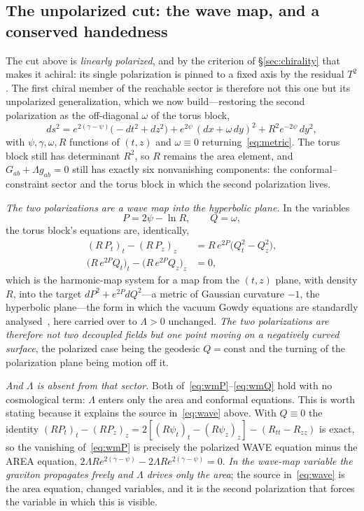 \documentclass[11pt,a4paper]{article}
\theoremstyle{plain}
\theoremstyle{definition}
\theoremstyle{remark}
\begin{document}
\subsection{The unpolarized cut: the wave map, and a conserved handedness}\label{sec:unpolarized}
The cut above is \emph{linearly polarized}, and by the criterion of \S\ref{sec:chirality} that makes it achiral: its single polarization is pinned to a fixed axis by the residual $T^2$. The first chiral member of the reachable sector is therefore not this one but its unpolarized generalization, which we now build---restoring the second polarization as the off-diagonal $\omega$ of the torus block,
\begin{equation}\label{eq:unpolarized}
ds^2 = e^{2(\gamma-\psi)}\bigl(-dt^2+dz^2\bigr) + e^{2\psi}\,(dx+\omega\,dy)^2 + R^2 e^{-2\psi}\,dy^2,
\end{equation}
with $\psi,\gamma,\omega,R$ functions of $(t,z)$ and $\omega\equiv0$ returning~\eqref{eq:metric}. The torus block still has determinant $R^2$, so $R$ remains the area element, and $G_{ab}+\Lambda g_{ab}=0$ still has exactly six nonvanishing components: the conformal--constraint sector and the torus block in which the second polarization lives.

\emph{The two polarizations are a wave map into the hyperbolic plane.} In the variables
\begin{equation}\label{eq:wavemapvars}
P = 2\psi-\ln R,\qquad Q=\omega,
\end{equation}
the torus block's equations are, identically,
\begin{align}
(R\,P_t)_t-(R\,P_z)_z &= R\,e^{2P}\bigl(Q_t^2-Q_z^2\bigr), \label{eq:wmP}\\
\bigl(R\,e^{2P}Q_t\bigr)_t-\bigl(R\,e^{2P}Q_z\bigr)_z &= 0, \label{eq:wmQ}
\end{align}
which is the harmonic-map system for a map from the $(t,z)$ plane, with density $R$, into the target $dP^2+e^{2P}dQ^2$---a metric of Gaussian curvature $-1$, the hyperbolic plane---the form in which the vacuum Gowdy equations are standardly analysed~\cite{Ringstrom2009}, here carried over to $\Lambda>0$ unchanged. \emph{The two polarizations are therefore not two decoupled fields but one point moving on a negatively curved surface}, the polarized case being the geodesic $Q=\mathrm{const}$ and the turning of the polarization plane being motion off it.

\emph{And $\Lambda$ is absent from that sector.} Both of~\eqref{eq:wmP}--\eqref{eq:wmQ} hold with no cosmological term: $\Lambda$ enters only the area and conformal equations. This is worth stating because it explains the source in~\eqref{eq:wave} above. With $Q\equiv0$ the identity $(R P_t)_t-(R P_z)_z = 2[(R\psi_t)_t-(R\psi_z)_z]-(R_{tt}-R_{zz})$ is exact, so the vanishing of~\eqref{eq:wmP} is precisely the polarized WAVE equation minus the AREA equation, $2\Lambda Re^{2(\gamma-\psi)}-2\Lambda Re^{2(\gamma-\psi)}=0$. \emph{In the wave-map variable the graviton propagates freely and $\Lambda$ drives only the area}; the source in~\eqref{eq:wave} is the area equation, changed variables, and it is the second polarization that forces the variable in which this is visible.
\end{document}
